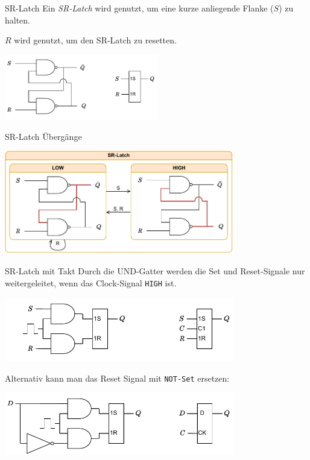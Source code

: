 \begin{defi}{SR-Latch}
    Ein \emph{SR-Latch} wird genutzt, um eine kurze anliegende Flanke ($S$) zu halten.

    $R$ wird genutzt, um den SR-Latch zu resetten.

    \begin{center}
        \includegraphics[width=0.5\textwidth]{includes/figures/defi_sr_latch.pdf}
    \end{center}
\end{defi}

\begin{bonus}{SR-Latch Übergänge}
    \begin{center}
        \includegraphics[width=0.75\textwidth]{includes/figures/bonus_sr_latch.pdf}
    \end{center}
\end{bonus}

\begin{defi}{SR-Latch mit Takt}
    Durch die UND-Gatter werden die Set und Reset-Signale nur weitergeleitet, wenn das Clock-Signal \texttt{HIGH} ist.

    \begin{center}
        \includegraphics[width=0.75\textwidth]{includes/figures/defi_lr_latch_clock.pdf}
    \end{center}

    Alternativ kann man das Reset Signal mit \texttt{NOT-Set} ersetzen:

    \begin{center}
        \includegraphics[width=0.75\textwidth]{includes/figures/defi_lr_latch_clock2.pdf}
    \end{center}
\end{defi}

